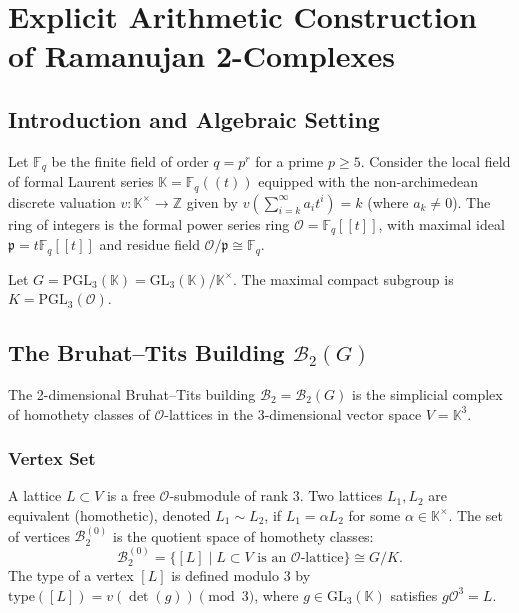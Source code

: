 \chapter{Explicit Arithmetic Construction of Ramanujan 2-Complexes}

\section{Introduction and Algebraic Setting}
Let $\mathbb{F}_q$ be the finite field of order $q = p^r$ for a prime $p \ge 5$. Consider the local field of formal Laurent series $\mathbb{K} = \mathbb{F}_q((t))$ equipped with the non-archimedean discrete valuation $v: \mathbb{K}^\times \to \mathbb{Z}$ given by $v(\sum_{i=k}^\infty a_i t^i) = k$ (where $a_k \neq 0$). The ring of integers is the formal power series ring $\mathcal{O} = \mathbb{F}_q[[t]]$, with maximal ideal $\mathfrak{p} = t\mathbb{F}_q[[t]]$ and residue field $\mathcal{O}/\mathfrak{p} \cong \mathbb{F}_q$.

Let $G = \mathrm{PGL}_3(\mathbb{K}) = \mathrm{GL}_3(\mathbb{K}) / \mathbb{K}^\times$. The maximal compact subgroup is $K = \mathrm{PGL}_3(\mathcal{O})$.

\section{The Bruhat--Tits Building $\mathcal{B}_2(G)$}
The 2-dimensional Bruhat--Tits building $\mathcal{B}_2 = \mathcal{B}_2(G)$ is the simplicial complex of homothety classes of $\mathcal{O}$-lattices in the 3-dimensional vector space $V = \mathbb{K}^3$.

\subsection{Vertex Set}
A lattice $L \subset V$ is a free $\mathcal{O}$-submodule of rank 3. Two lattices $L_1, L_2$ are equivalent (homothetic), denoted $L_1 \sim L_2$, if $L_1 = \alpha L_2$ for some $\alpha \in \mathbb{K}^\times$.
The set of vertices $\mathcal{B}_2^{(0)}$ is the quotient space of homothety classes:
\[
\mathcal{B}_2^{(0)} = \{ [L] \mid L \subset V \text{ is an } \mathcal{O}\text{-lattice} \} \cong G / K.
\]
The type of a vertex $[L]$ is defined modulo 3 by $\mathrm{type}([L]) = v(\det(g)) \pmod 3$, where $g \in \mathrm{GL}_3(\mathbb{K})$ satisfies $g \mathcal{O}^3 = L$.


